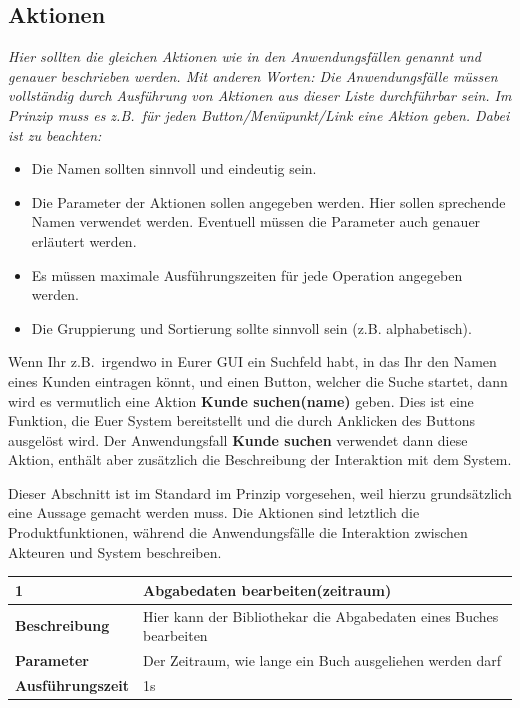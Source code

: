 \documentclass[fontsize=12pt,paper=a4,twoside]{scrartcl}
\begin{document}
\newpage
\subsection{Aktionen}
  {\em Hier sollten die gleichen Aktionen wie in den Anwendungsfällen
  genannt und genauer beschrieben werden. Mit anderen Worten: Die
  Anwendungsfälle müssen vollständig durch Ausführung von Aktionen aus
  dieser Liste durchführbar sein. Im Prinzip muss es z.B.\ für jeden
  Button/Menüpunkt/Link eine Aktion geben. Dabei ist zu beachten:
  \begin{itemize}
    \item Die Namen sollten sinnvoll und eindeutig sein.

    \item Die Parameter der Aktionen sollen angegeben werden. Hier
    sollen sprechende Namen verwendet werden. Eventuell müssen die
    Parameter auch genauer erläutert werden.

    \item Es müssen maximale Ausführungszeiten für jede Operation
    angegeben werden.
    
  \item Die Gruppierung und Sortierung sollte sinnvoll sein
    (z.B. alphabetisch).
  \end{itemize}

  Wenn Ihr z.B.\ irgendwo in Eurer GUI ein Suchfeld habt, in das Ihr
  den Namen eines Kunden eintragen könnt, und einen Button, welcher die
  Suche startet, dann wird es vermutlich eine Aktion {\bf Kunde
    suchen(name)} geben. Dies ist eine Funktion, die Euer System
  bereitstellt und die durch Anklicken des Buttons ausgelöst wird. Der
  Anwendungsfall {\bf Kunde suchen} verwendet dann diese Aktion,
  enthält aber zusätzlich die Beschreibung der Interaktion mit dem
  System.
  
  Dieser Abschnitt ist im Standard im Prinzip vorgesehen, weil hierzu
  grundsätzlich eine Aussage gemacht werden muss. Die Aktionen sind
  letztlich die Produktfunktionen, während die Anwendungsfälle die
  Interaktion zwischen Akteuren und System beschreiben. }

  \begin{table}[htbp]
  \label{a1}
  \begin{tabular}{|l|p{10cm}|}
  \hline 
  \textbf{1} & \textbf{Abgabedaten bearbeiten(zeitraum)} \\ \hline
  \textbf{Beschreibung} & Hier kann der Bibliothekar die Abgabedaten eines Buches bearbeiten\\ \hline
  \textbf{Parameter} & Der Zeitraum, wie lange ein Buch ausgeliehen werden darf\\ \hline
  \textbf{Ausführungszeit} & 1s\\ \hline
  \end{tabular}
  \end{table}
  
\end{document}
